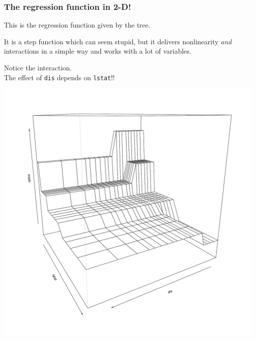 \documentclass{beamer}
\newcommand{\sko}{\vspace{.1in}}
\begin{document}
\begin{frame}
\frametitle{The regression function in 2-D!}

\begin{minipage}{1.5in}
{\footnotesize
This is the regression function given by the tree.\sko

It is a step function which can seem stupid,
but it delivers nonlinearity {\it and} interactions in
a simple way and works with a lot of variables.\sko

Notice the interaction.\\
The effect of {\tt dis} depends on {\tt lstat}!!
}
\end{minipage}
\hspace*{-.2in}
\begin{minipage}{2.0in}
\begin{center}
\includegraphics[scale=.28]{boston-lstat-dis-persp.pdf}
\end{center}
\end{minipage}

\vspace{-.2in}


\end{frame}
\end{document}
